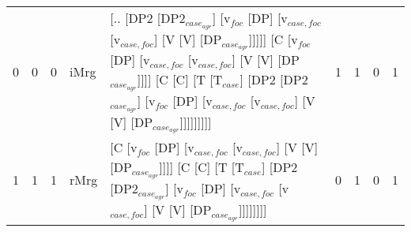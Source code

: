 \begin{tabularx}{\linewidth}{rrrlXrrrr}
   0 &       0 &   0 & iMrg & [.. [DP2 [DP2$_{case_{agr}}$] [v$_{foc}$ [DP] [v$_{case,foc}$ [v$_{case,foc}$] [V [V] [DP$_{case_{agr}}$]]]]] [C [v$_{foc}$ [DP] [v$_{case,foc}$ [v$_{case,foc}$] [V [V] [DP$_{case_{agr}}$]]]] [C [C] [T [T$_{case}$] [DP2 [DP2$_{case_{agr}}$] [v$_{foc}$ [DP] [v$_{case,foc}$ [v$_{case,foc}$] [V [V] [DP$_{case_{agr}}$]]]]]]]]]              &             1 &             1 &                  0 &          1 \\
   1 &       1 &   1 & rMrg & [C [v$_{foc}$ [DP] [v$_{case,foc}$ [v$_{case,foc}$] [V [V] [DP$_{case_{agr}}$]]]] [C [C] [T [T$_{case}$] [DP2 [DP2$_{case_{agr}}$] [v$_{foc}$ [DP] [v$_{case,foc}$ [v$_{case,foc}$] [V [V] [DP$_{case_{agr}}$]]]]]]]]                                                                                                     &             0 &             1 &                  0 &          1 \\
\hline
\end{tabularx}\endgroup\\
